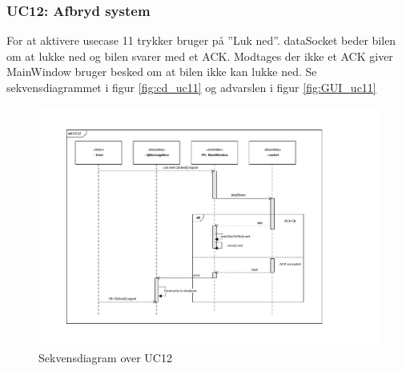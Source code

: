 \subsubsection{UC12: Afbryd system}
For at aktivere usecase 11 trykker bruger på ''Luk ned''.
dataSocket beder bilen om at lukke ned og bilen svarer med et ACK. Modtages der ikke et ACK giver MainWindow bruger besked om at bilen ikke kan lukke ned. Se sekvensdiagrammet i figur \ref{fig:cd_uc11} og advarslen i figur \ref{fig:GUI_uc11}

\begin{figure}[H]
\centering
\includegraphics[width=\textwidth* 2/3,height=\textwidth* 4/10 ]{../fig/diagrammer/pc/sd_uc12.pdf}
\caption{Sekvensdiagram over UC12}
\label{fig:cd_uc12}
\end{figure}

